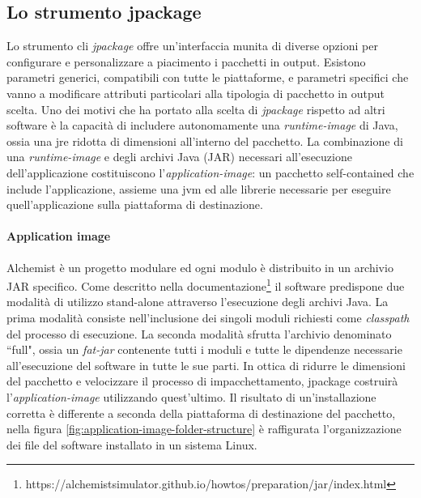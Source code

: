 \subsection{Lo strumento jpackage}\label{sec:design-jpackage}
Lo strumento \ac{cli} \textit{jpackage} offre un'interfaccia munita di diverse opzioni per configurare e personalizzare a piacimento i pacchetti in output. Esistono parametri generici, compatibili con tutte le piattaforme, e parametri specifici che vanno a modificare attributi particolari alla tipologia di pacchetto in output scelta. Uno dei motivi che ha portato alla scelta di \textit{jpackage} rispetto ad altri software è la capacità di includere autonomamente una \textit{runtime-image} di Java, ossia una \ac{jre} ridotta di dimensioni all'interno del pacchetto. La combinazione di una \textit{runtime-image} e degli archivi Java (JAR) necessari all'esecuzione dell'applicazione costituiscono l'\textit{application-image}: un pacchetto self-contained che include l'applicazione, assieme una \ac{jvm} ed alle librerie necessarie per eseguire quell'applicazione sulla piattaforma di destinazione.

\paragraph{Application image} Alchemist è un progetto modulare ed ogni modulo è distribuito in un archivio JAR specifico. Come descritto nella documentazione\footnote{https://alchemistsimulator.github.io/howtos/preparation/jar/index.html} il software predispone due modalità di utilizzo stand-alone attraverso l'esecuzione degli archivi Java. La prima modalità consiste nell'inclusione dei singoli moduli richiesti come \textit{classpath} del processo di esecuzione. La seconda modalità sfrutta l'archivio denominato ``full", ossia un \textit{fat-jar} contenente tutti i moduli e tutte le dipendenze necessarie all'esecuzione del software in tutte le sue parti. In ottica di ridurre le dimensioni del pacchetto e velocizzare il processo di impacchettamento, jpackage costruirà l'\textit{application-image} utilizzando quest'ultimo. Il risultato di un'installazione corretta è differente a seconda della piattaforma di destinazione del pacchetto, nella figura \ref{fig:application-image-folder-structure} è raffigurata l'organizzazione dei file del software installato in un sistema Linux.  

